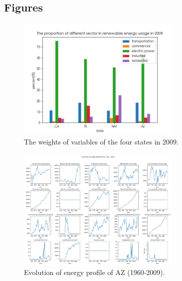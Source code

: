 \documentclass[a4paper,11pt]{article}
\begin{document}
\newpage%
\begin{appendices} 
    \section*{Figures}
\begin{figure}[h]%
    \centering
    \includegraphics[width=0.7\textwidth]{./Pic/1-3.png}
    \caption{The weights of variables of the four states in 2009.}
\end{figure}
\begin{figure}[h]%
    \centering
    \includegraphics[width=0.7\textwidth]{./Pic/B-classify-AZ.png}
    \caption{Evolution of energy profile of AZ (1960-2009).}
    \label{fig:part-2-AZ}
\end{figure}


\end{appendices}
\end{document}
